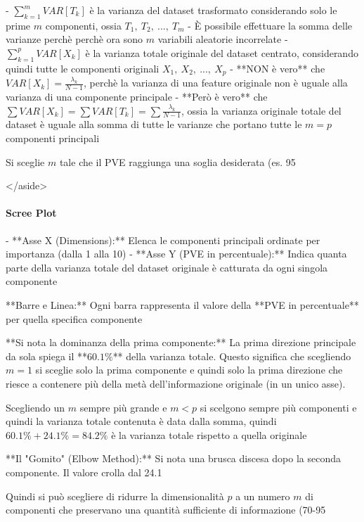 - $\sum_{k=1}^{m}VAR[T_k]$ è la varianza del dataset trasformato considerando solo le prime $m$ componenti, ossia $T_1,\ T_2,\ ...,\ T_m$
- È possibile effettuare la somma delle varianze perchè perchè ora sono $m$ variabili aleatorie incorrelate
- $\sum_{k=1}^{p} VAR[X_k]$ è la varianza totale originale del dataset centrato, considerando quindi tutte le componenti originali $X_1,\ X_2,\ ...,\ X_p$
- **NON è vero** che $VAR[X_k] = \frac{\lambda_k}{N-1}$, perchè la varianza di una feature originale non è uguale alla varianza di una componente principale
- **Però è vero** che $\sum VAR[X_k] = \sum VAR[T_k] =\sum \frac{\lambda_k}{N-1}$, ossia la varianza originale totale del dataset è uguale alla somma di tutte le varianze che portano tutte le $m=p$ componenti principali

Si sceglie $m$ tale che il PVE raggiunga una soglia desiderata (es. 95%

</aside>

\paragraph{Scree Plot}

- **Asse X (Dimensions):** Elenca le componenti principali ordinate per importanza (dalla 1 alla 10)
- **Asse Y (PVE in percentuale):** Indica quanta parte della varianza totale del dataset originale è catturata da ogni singola componente

**Barre e Linea:** Ogni barra rappresenta il valore della **PVE in percentuale** per quella specifica componente

**Si nota la dominanza della prima componente:** La prima direzione principale da sola spiega il **$60.1\%$** della varianza totale. Questo significa che scegliendo $m=1$ si sceglie solo la prima componente e quindi solo la prima direzione che riesce a contenere più della metà dell'informazione originale (in un unico asse).

Scegliendo un $m$ sempre più grande e $m<p$ si scelgono sempre più componenti e quindi la varianza totale contenuta è data dalla somma, quindi $60.1\% + 24.1\%=84.2\%$ è la varianza totale rispetto a quella originale

**Il "Gomito" (Elbow Method):** Si nota una brusca discesa dopo la seconda componente. Il valore crolla dal 24.1%

Quindi si può scegliere di ridurre la dimensionalità $p$ a un numero $m$ di componenti che preservano una quantità sufficiente di informazione (70-95%

